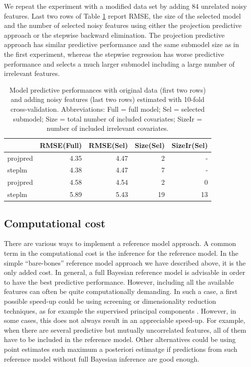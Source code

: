 \documentclass[american,]{article}
\theoremstyle{definition}
\begin{document}
We repeat the experiment with a modified data set by adding 84
unrelated noisy features. Last two rows of Table
\ref{tab:model_performances} report RMSE, the size of the selected
model and the number of selected noisy features using either the
projection predictive approach or the stepwise backward elimination.
The projection predictive approach has similar predictive performance
and the same submodel size as in the first experiment, whereas the
stepwise regression has worse predictive performance and selects a
much larger submodel including a large number of irrelevant features.

\begin{table}[tp]
\scriptsize
\centering
\begin{tabular}{l|r|r|r|r}
  \hline
 & RMSE(Full) & RMSE(Sel) & Size(Sel) & SizeIr(Sel) \\ 
  \hline
projpred & 4.35 & 4.47 & 2 & -  \\
steplm & 4.38 & 4.47 & 7 & - \\
\hline
\hline
projpred & 4.58 & 4.54 & 2 & 0  \\
steplm & 5.89 & 5.43 & 19 & 13 \\
   \hline
\end{tabular}
\caption{Model predictive performances with original data (first two
  rows) and adding noisy features (last two rows) estimated with
  10-fold cross-validation. Abbreviations: Full = full model; Sel =
  selected submodel; Size = total number of included covariates;
  SizeIr = number of included irrelevant covariates.}
\label{tab:model_performances}
\end{table}

\hypertarget{computational-burden}{%
\subsection{Computational cost} \label{computational-burden}}

There are various ways to implement a reference model approach. A
common term in the computational cost is the inference for the
reference model. In the simple ``bare-bones'' reference model approach
we have described above, it is the only added cost. In general, a full
Bayesian reference model is advisable in order to have the best
predictive performance. However, including all the available features
can often be quite computationally demanding. In such a case, a first
possible speed-up could be using screening or dimensionality reduction
techniques, as for example the supervised principal components
\citep{bair2006prediction,piironen2018}. However, in some cases, this
does not always result in an appreciable speed-up. For example, when
there are several predictive but mutually uncorrelated features, all
of them have to be included in the reference model. Other alternatives
could be using point estimates such maximum a posteriori estimatge if
predictions from such reference model without full Bayesian inference
are good enough.
\end{document}
